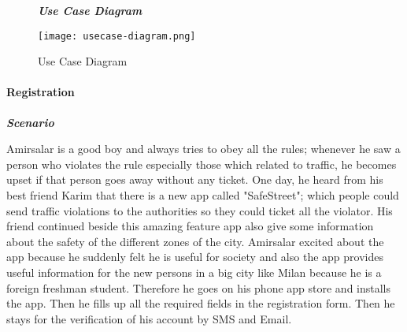 \begin{figure}[H]
\begin{flushleft}\emph{\textbf{Use Case Diagram}}\end{flushleft}
\caption{Use Case Diagram}
\label{usecase}
\centering
\texttt{[image: usecase-diagram.png]}
\end{figure}
\paragraph{Registration}
\hfill \break

\begin{flushleft}\emph{\textbf{Scenario}}\end{flushleft}

Amirsalar is a good boy and always tries to obey all the rules; whenever he saw a person who violates the rule especially those which related to traffic, he becomes upset if that person goes away without any ticket. One day, he heard from his best friend Karim that there is a new app called "SafeStreet"; which people could send traffic violations to the authorities so they could ticket all the violator. His friend continued beside this amazing feature app also give some information about the safety of the different zones of the city. Amirsalar excited about the app because he suddenly felt he is useful for society and also the app provides useful information for the new persons in a big city like Milan because he is a foreign freshman student. Therefore he goes on his phone app store and installs the app. Then he fills up all the required fields in the registration form. Then he stays for the verification of his account by SMS and Email.


